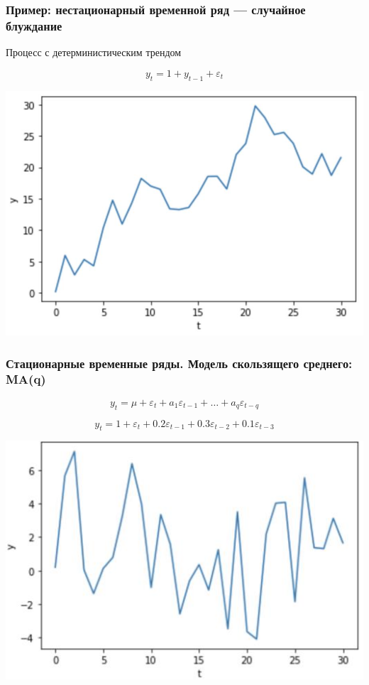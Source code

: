 \documentclass[fullscreen=true, bookmarks=true, hyperref={pdfencoding=unicode}]{beamer}
\begin{document}
\begin{frame}
  \frametitle{Пример: нестационарный временной ряд — случайное блуждание}

  Процесс с детерминистическим трендом

  $$ y_t = 1 + y_{t-1} + \varepsilon_t $$

  \begin{center}
    \includegraphics[keepaspectratio,
                     width=.7\paperwidth]{random_unst.jpg}
  \end{center}
\end{frame}


\begin{frame}
  \frametitle{Стационарные временные ряды. Модель скользящего среднего: MA(q)}

  $$ y_t = \mu + \varepsilon_t + a_1\varepsilon_{t-1} + \dots + a_q\varepsilon_{t-q} $$

  $$ y_t = 1 + \varepsilon_t + 0.2\varepsilon_{t-1} + 0.3\varepsilon_{t-2} + 0.1\varepsilon_{t-3} $$

  \begin{center}
    \includegraphics[keepaspectratio,
                     width=.6\paperwidth]{mean_average_model.jpg}
  \end{center}
\end{frame}
\end{document}
